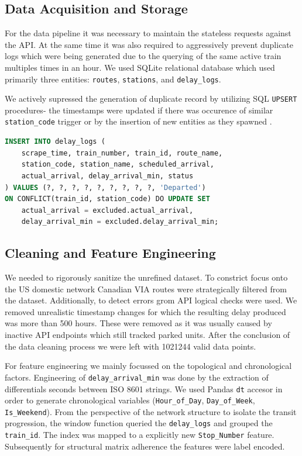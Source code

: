 \documentclass[11pt]{article}
\begin{document}
\subsection{Data Acquisition and Storage}
For the data pipeline it was necessary to maintain the stateless requests against the API. At the same time it was also required to aggressively prevent duplicate logs which were being generated due to the querying of the same active train multiples times in an hour. We used SQLite relational database which used primarily three entities:  \texttt{routes}, \texttt{stations}, and \texttt{delay\_logs}. 

 We actively supressed the generation of duplicate record by utilizing SQL \texttt{UPSERT} procedures- the timestamps were updated if there was occurence of similar \texttt{station\_code} trigger or by the insertion of new entities as they spawned . 

\begin{lstlisting}[language=SQL, caption=Example of the UPSERT architecture utilized during real-time data scraping]
INSERT INTO delay_logs (
    scrape_time, train_number, train_id, route_name,
    station_code, station_name, scheduled_arrival, 
    actual_arrival, delay_arrival_min, status
) VALUES (?, ?, ?, ?, ?, ?, ?, ?, ?, 'Departed')
ON CONFLICT(train_id, station_code) DO UPDATE SET
    actual_arrival = excluded.actual_arrival,
    delay_arrival_min = excluded.delay_arrival_min;
\end{lstlisting}

\subsection{Cleaning and Feature Engineering}
We needed to rigorously sanitize the unrefined dataset. To constrict focus onto the US domestic network Canadian VIA routes were strategically filtered from the dataset. Additionally, to detect errors grom API logical checks were used. We removed unrealistic timestamp changes for which the resulting delay produced was more than 500 hours. These were removed as it was usually caused by inactive API endpoints which still tracked parked units. After the conclusion of the data cleaning process we were left with 1021244 valid data points. 

For feature engineering we mainly focussed on the topological and chronological factors.  Engineering of \texttt{delay\_arrival\_min} was done by the extraction of differentials seconds between ISO 8601 strings. We used Pandas \texttt{dt} accesor in order to generate chronological variables (\texttt{Hour\_of\_Day}, \texttt{Day\_of\_Week},  \texttt{Is\_Weekend}). From the perspective of the network structure to isolate the transit progression, the window function queried the  \texttt{delay\_logs} and grouped the \texttt{train\_id}. The index was mapped to a explicitly new \texttt{Stop\_Number} feature. Subsequently for structural matrix adherence the features were label encoded.
\end{document}
